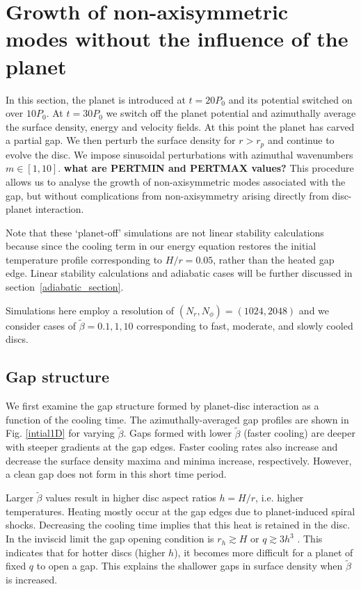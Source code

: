 \section{Growth of non-axisymmetric modes without the influence of the
  planet}
In this section, the planet is introduced at $t=20P_0$ and 
its potential switched on over $10P_0$. At $t=30P_0$ we switch off the
planet potential and azimuthally average the surface density, energy
and velocity fields. At this point the planet has carved a partial
gap. We then perturb the surface density for $r>r_p$ and continue to 
evolve the disc. We impose  sinusoidal perturbations with 
azimuthal wavenumbers $m\in[1,10]$. {\bf what are PERTMIN and PERTMAX values?}  
This procedure allows us to analyse the growth of 
non-axisymmetric modes associated with the gap, but without
complications from non-axisymmetry arising directly from disc-planet
interaction.

Note that these `planet-off' simulations are not linear stability
calculations because since the cooling term in our energy equation
restores the initial temperature profile corresponding to $H/r=0.05$,
rather than the heated gap edge. Linear stability calculations and
adiabatic cases will be further discussed in
section~\ref{adiabatic_section}.  


Simulations here employ a resolution of $(N_r,N_{\phi})=(1024,2048)$
and we consider 
cases of $\tilde{\beta}=0.1,1,10$ corresponding to fast, moderate,
and slowly cooled discs.  

\subsection{Gap structure}
We first examine the gap structure formed by planet-disc
interaction as a function of the cooling time. The azimuthally-averaged 
gap profiles are shown in Fig. \ref{intial1D} for varying
$\tilde\beta$. Gaps formed with lower $\tilde\beta$ (faster cooling)
are deeper with steeper gradients at the gap edges. Faster cooling rates also 
increase and decrease the surface density maxima and 
minima increase, respectively. However, a clean gap does not form
in this short time period. 


Larger $\tilde\beta$ values result in higher disc aspect ratios $h=H/r$,
i.e. higher temperatures. Heating mostly occur at the gap edges
due to planet-induced spiral shocks. Decreasing the cooling time
implies that this heat is retained in the disc. In the inviscid limit the gap
opening condition is $r_h\gtrsim H$ or $q\gtrsim 3h^3$
\citep{crida06}. 
This indicates that for hotter discs (higher
$h$), it becomes more difficult for a planet of fixed $q$ to open a
gap. This explains the shallower gaps in surface density when
$\tilde{\beta}$ is increased. 


